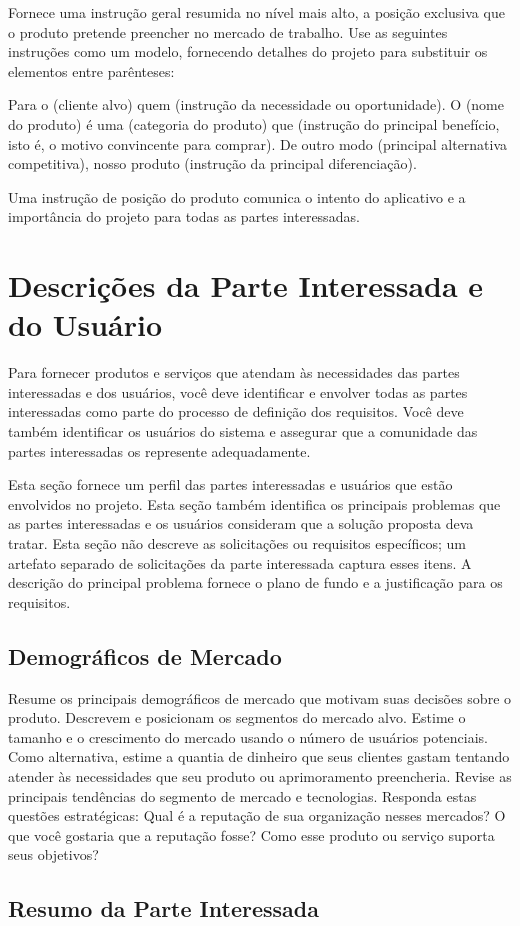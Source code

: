 \documentclass{report}
\begin{document}
Fornece uma instrução geral resumida no nível mais alto, a posição exclusiva
que o produto pretende preencher no mercado de trabalho. Use as seguintes
instruções como um modelo, fornecendo detalhes do projeto para substituir os
elementos entre parênteses:

Para o (cliente alvo) quem (instrução da necessidade ou oportunidade). O (nome
do produto) é uma (categoria do produto) que (instrução do principal benefício,
isto é, o motivo convincente para comprar). De outro modo (principal
alternativa competitiva), nosso produto (instrução da principal diferenciação).

Uma instrução de posição do produto comunica o intento do aplicativo e a
importância do projeto para todas as partes interessadas.

\chapter{Descrições da Parte Interessada e do Usuário}

Para fornecer produtos e serviços que atendam às necessidades das partes
interessadas e dos usuários, você deve identificar e envolver todas as partes
interessadas como parte do processo de definição dos requisitos. Você deve
também identificar os usuários do sistema e assegurar que a comunidade das
partes interessadas os represente adequadamente.

Esta seção fornece um perfil das partes interessadas e usuários que estão
envolvidos no projeto. Esta seção também identifica os principais problemas que
as partes interessadas e os usuários consideram que a solução proposta deva
tratar. Esta seção não descreve as solicitações ou requisitos específicos; um
artefato separado de solicitações da parte interessada captura esses itens. A
descrição do principal problema fornece o plano de fundo e a justificação para
os requisitos.

\section{Demográficos de Mercado}

Resume os principais demográficos de mercado que motivam suas decisões sobre o
produto. Descrevem e posicionam os segmentos do mercado alvo. Estime o tamanho
e o crescimento do mercado usando o número de usuários potenciais. Como
alternativa, estime a quantia de dinheiro que seus clientes gastam tentando
atender às necessidades que seu produto ou aprimoramento preencheria. Revise as
principais tendências do segmento de mercado e tecnologias. Responda estas
questões estratégicas: Qual é a reputação de sua organização nesses mercados? O
que você gostaria que a reputação fosse? Como esse produto ou serviço suporta
seus objetivos? \section{Resumo da Parte Interessada}
\end{document}
